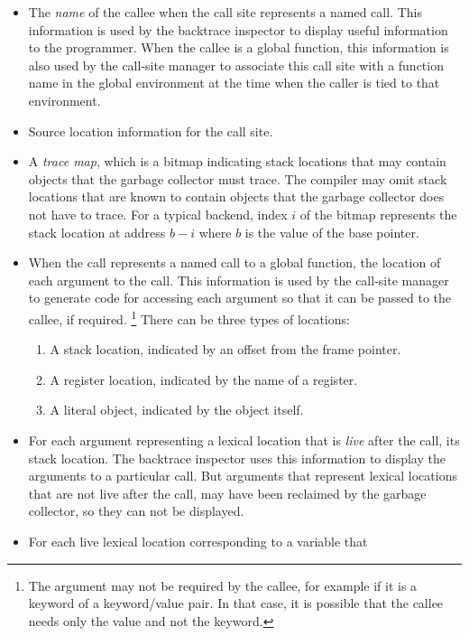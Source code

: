 \begin{itemize}
\item The \emph{name} of the callee when the call site represents a
  named call.  This information is used by the backtrace inspector to
  display useful information to the programmer.  When the callee is a
  global function, this information is also used by the call-site
  manager to associate this call site with a function name in the
  global environment at the time when the caller is tied to that
  environment.
\item Source location information for the call site.
\item A \emph{trace map}, which is a bitmap indicating stack locations
  that may contain objects that the garbage collector must trace.  The
  compiler may omit stack locations that are known to contain
  \commonlisp{} objects that the garbage collector does not have to
  trace.  For a typical backend, index $i$ of the bitmap represents
  the stack location at address $b-i$ where $b$ is the value of the
  base pointer.
\item When the call represents a named call to a global function, the
  location of each argument to the call.  This information is used by
  the call-site manager to generate code for accessing each argument
  so that it can be passed to the callee, if required.%
  \footnote{The argument may not be required by the callee, for
    example if it is a keyword of a keyword/value pair.  In that case,
    it is possible that the callee needs only the value and not the
    keyword.}
  There can be three types of locations:
  \begin{enumerate}
  \item A stack location, indicated by an offset from the frame
    pointer.
  \item A register location, indicated by the name of a register.
  \item A literal object, indicated by the object itself.
  \end{enumerate}
\item For each argument representing a lexical location that is
  \emph{live} after the call, its stack location.  The backtrace
  inspector uses this information to display the arguments to a
  particular call.  But arguments that represent lexical locations
  that are not live after the call, may have been reclaimed by the
  garbage collector, so they can not be displayed.
\item For each live lexical location corresponding to a variable that

\end{itemize}
